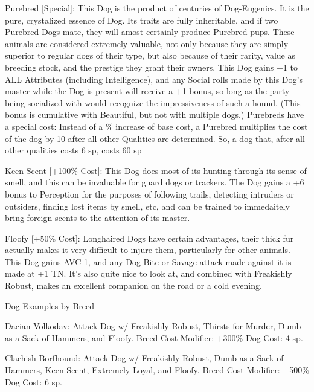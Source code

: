 \documentclass[oneside,11pt,english]{book}
\begin{document}
Purebred [Special]: This Dog is the product of centuries of Dog-Eugenics. It is the pure, crystalized 
essence of Dog. Its traits are fully inheritable, and if two Purebred Dogs mate, they will amost certainly 
produce Purebred pups. These animals are considered extremely valuable, not only because they are 
simply superior to regular dogs of their type, but also because of their rarity, value as breeding stock, and 
the prestige they grant their owners. 
This Dog gains +1 to ALL Attributes (including Intelligence), and any Social rolls made by this Dog’s 
master while the Dog is present will receive a +1 bonus, so long as the party being socialized with would 
recognize the impressiveness of such a hound. (This bonus is cumulative with Beautiful, but not with 
multiple dogs.) 
Purebreds have a special cost: Instead of a \% increase of base cost, a Purebred multiplies the cost of the 
dog by 10 after all other Qualities are determined. So, a dog that, after all other qualities costs 6 sp, costs 
60 sp 

 

Keen Scent [+100\% Cost]: This Dog does most of its hunting through its sense of smell, and this can be 
invaluable for guard dogs or trackers. The Dog gains a +6 bonus to Perception for the purposes of 
following trails, detecting intruders or outsiders, finding lost items by smell, etc, and can be trained to 
immedaitely bring foreign scents to the attention of its master. 

 

Floofy [+50\% Cost]: Longhaired Dogs have certain advantages, their thick fur actually makes it very 
difficult to injure them, particularly for other animals. This Dog gains AVC 1, and any Dog Bite or 
Savage attack made against it is made at +1 TN. 
It’s also quite nice to look at, and combined with Freakishly Robust, makes an excellent companion on 
the road or a cold evening. 

 

Dog Examples by Breed 

 

Dacian Volkodav: Attack Dog w/ Freakishly Robust, Thirsts for Murder, Dumb as a Sack of Hammers, 
and Floofy. 
Breed Cost Modifier: +300\% 
Dog Cost: 4 sp. 

 


Clachish Borfhound: Attack Dog w/ Freakishly Robust, Dumb as a Sack of Hammers, Keen Scent, 
Extremely Loyal, and Floofy. 
Breed Cost Modifier: +500\% 
Dog Cost: 6 sp. 

 
\end{document}
